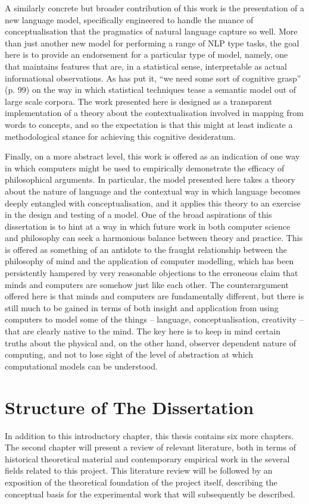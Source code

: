 A similarly concrete but broader contribution of this work is the presentation of a new language model, specifically engineered to handle the nuance of conceptualisation that the pragmatics of natural language capture so well.  More than just another new model for performing a range of NLP type tasks, the goal here is to provide an endorsement for a particular type of model, namely, one that maintains features that are, in a statistical sense, interpretable as actual informational observations.  As \cite{White2009} has put it, ``we need some sort of cognitive grasp'' (p. 99) on the way in which statistical techniques tease a semantic model out of large scale corpora.  The work presented here is designed as a transparent implementation of a theory about the contextualisation involved in mapping from words to concepts, and so the expectation is that this might at least indicate a methodological stance for achieving this cognitive desideratum.

Finally, on a more abstract level, this work is offered as an indication of one way in which computers might be used to empirically demonstrate the efficacy of philosophical arguments.  In particular, the model presented here takes a theory about the nature of language and the contextual way in which language becomes deeply entangled with conceptualisation, and it applies this theory to an exercise in the design and testing of a model.  One of the broad aspirations of this dissertation is to hint at a way in which future work in both computer science and philosophy can seek a harmonious balance between theory and practice.  This is offered as something of an antidote to the fraught relationship between the philosophy of mind and the application of computer modelling, which has been persistently hampered by very reasonable objections to the erroneous claim that minds and computers are somehow just like each other.  The counterargument offered here is that minds and computers are fundamentally different, but there is still much to be gained in terms of both insight and application from using computers to model some of the things -- language, conceptualisation, creativity -- that are clearly native to the mind.  The key here is to keep in mind certain truths about the physical and, on the other hand, observer dependent nature of computing, and not to lose sight of the level of abstraction at which computational models can be understood.

\section{Structure of The Dissertation}
In addition to this introductory chapter, this thesis contains six more chapters.  The second chapter will present a review of relevant literature, both in terms of historical theoretical material and contemporary empirical work in the several fields related to this project.  This literature review will be followed by an exposition of the theoretical foundation of the project itself, describing the conceptual basis for the experimental work that will subsequently be described.

